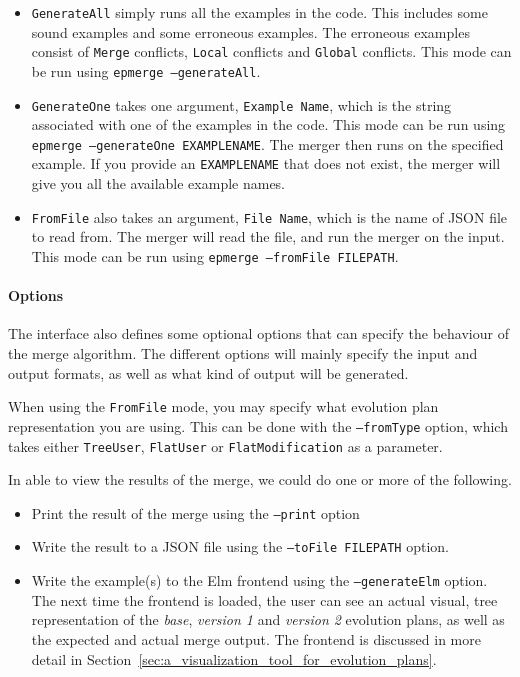 \documentclass[a4paper,english]{ifimaster}
\begin{document}
\begin{itemize}
\item \texttt{GenerateAll} simply runs all the examples in the code. This includes some sound examples and some erroneous examples. The erroneous examples consist of \texttt{Merge} conflicts, \texttt{Local} conflicts and \texttt{Global} conflicts. This mode can be run using \texttt{epmerge --generateAll}.
\item \texttt{GenerateOne} takes one argument, \texttt{Example Name}, which is the string associated with one of the examples in the code. This mode can be run using \texttt{epmerge --generateOne EXAMPLENAME}. The merger then runs on the specified example. If you provide an \texttt{EXAMPLENAME} that does not exist, the merger will give you all the available example names.
\item \texttt{FromFile} also takes an argument, \texttt{File Name}, which is the name of JSON file to read from. The merger will read the file, and run the merger on the input. This mode can be run using \texttt{epmerge --fromFile FILEPATH}.
\end{itemize}

\paragraph{Options}%
\label{par:options}

The interface also defines some optional options that can specify the behaviour of the merge algorithm. The different options will mainly specify the input and output formats, as well as what kind of output will be generated.

When using the \texttt{FromFile} mode, you may specify what evolution plan representation you are using. This can be done with the \texttt{--fromType} option, which takes either \texttt{TreeUser}, \texttt{FlatUser} or \texttt{FlatModification} as a parameter.

In able to view the results of the merge, we could do one or more of the following.

\begin{itemize}
  \item Print the result of the merge using the \texttt{--print} option
  \item Write the result to a JSON file using the \texttt{--toFile FILEPATH} option.
  \item Write the example(s) to the Elm frontend using the \texttt{--generateElm} option. The next time the frontend is loaded, the user can see an actual visual, tree representation of the \textit{base}, \textit{version 1} and \textit{version 2} evolution plans, as well as the expected and actual merge output. The frontend is discussed in more detail in Section~\vref{sec:a_visualization_tool_for_evolution_plans}.
\end{itemize}
\end{document}
